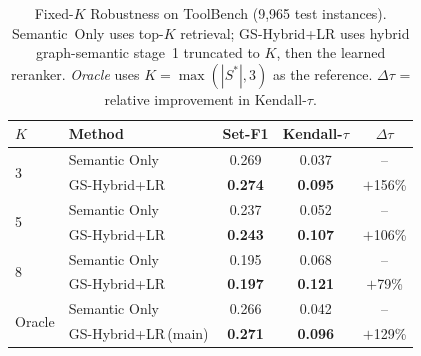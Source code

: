 \begin{table}[!t]
\caption{Fixed-$K$ Robustness on ToolBench (9,965 test instances).
Semantic~Only uses top-$K$ retrieval; GS-Hybrid+LR uses hybrid
graph-semantic stage~1 truncated to $K$, then the learned reranker.
\textit{Oracle} uses $K=\max(|S^*|,3)$ as the reference.
$\Delta\tau$ = relative improvement in Kendall-$\tau$.}
\label{tab:fixed_k}
\centering
\small
\setlength{\tabcolsep}{4pt}%
\begin{tabular}{llccc}
\toprule
$K$ & \textbf{Method} & \textbf{Set-F1} & \textbf{Kendall-$\tau$} & \textbf{$\Delta\tau$} \\
\midrule
\multirow{2}{*}{3}
 & Semantic Only       & 0.269 & 0.037 & -- \\
 & GS-Hybrid+LR        & \textbf{0.274} & \textbf{0.095} & $+$156\% \\
\midrule
\multirow{2}{*}{5}
 & Semantic Only       & 0.237 & 0.052 & -- \\
 & GS-Hybrid+LR        & \textbf{0.243} & \textbf{0.107} & $+$106\% \\
\midrule
\multirow{2}{*}{8}
 & Semantic Only       & 0.195 & 0.068 & -- \\
 & GS-Hybrid+LR        & \textbf{0.197} & \textbf{0.121} & $+$79\% \\
\midrule
\multirow{2}{*}{Oracle}
 & Semantic Only       & 0.266 & 0.042 & -- \\
 & GS-Hybrid+LR\,(main) & \textbf{0.271} & \textbf{0.096} & $+$129\% \\
\bottomrule
\end{tabular}
\end{table}
